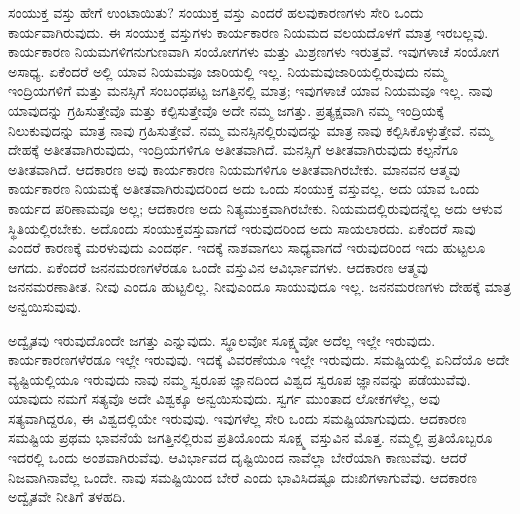 ಸಂಯುಕ್ತ ವಸ್ತು ಹೇಗೆ ಉಂಟಾಯಿತು? ಸಂಯುಕ್ತ ವಸ್ತು ಎಂದರೆ ಹಲವು\break ಕಾರಣಗಳು ಸೇರಿ ಒಂದು ಕಾರ್ಯವಾಗಿರುವುದು. ಈ ಸಂಯುಕ್ತ ವಸ್ತುಗಳು ಕಾರ್ಯಕಾರಣ ನಿಯಮದ ವಲಯದೊಳಗೆ ಮಾತ್ರ ಇರಬಲ್ಲವು. ಕಾರ್ಯಕಾರಣ ನಿಯಮಗಳಿ\-ಗನುಗುಣವಾಗಿ ಸಂಯೋಗಗಳು ಮತ್ತು ಮಿಶ್ರಣಗಳು ಇರುತ್ತವೆ. ಇವುಗಳಾಚೆ ಸಂಯೋಗ ಅಸಾಧ್ಯ. ಏಕೆಂದರೆ ಅಲ್ಲಿ ಯಾವ ನಿಯಮವೂ ಜಾರಿಯಲ್ಲಿ ಇಲ್ಲ. ನಿಯಮವು\break ಜಾರಿಯಲ್ಲಿರುವುದು ನಮ್ಮ ಇಂದ್ರಿಯಗಳಿಗೆ ಮತ್ತು ಮನಸ್ಸಿಗೆ ಸಂಬಂಧಪಟ್ಟ ಜಗತ್ತಿನಲ್ಲಿ ಮಾತ್ರ; ಇವುಗಳಾಚೆ ಯಾವ ನಿಯಮವೂ ಇಲ್ಲ. ನಾವು ಯಾವುದನ್ನು ಗ್ರಹಿಸುತ್ತೇವೊ ಮತ್ತು ಕಲ್ಪಿಸುತ್ತೇವೊ ಅದೇ ನಮ್ಮ ಜಗತ್ತು. ಪ್ರತ್ಯಕ್ಷವಾಗಿ ನಮ್ಮ ಇಂದ್ರಿಯಕ್ಕೆ ನಿಲುಕುವುದನ್ನು ಮಾತ್ರ ನಾವು ಗ್ರಹಿಸುತ್ತೇವೆ. ನಮ್ಮ ಮನಸ್ಸಿನಲ್ಲಿರುವುದನ್ನು ಮಾತ್ರ ನಾವು ಕಲ್ಪಿಸಿಕೊಳ್ಳುತ್ತೇವೆ. ನಮ್ಮ ದೇಹಕ್ಕೆ ಅತೀತವಾಗಿರುವುದು, ಇಂದ್ರಿಯಗಳಿಗೂ ಅತೀತವಾಗಿದೆ. ಮನಸ್ಸಿಗೆ ಅತೀತವಾಗಿರುವುದು ಕಲ್ಪನೆಗೂ ಅತೀತವಾಗಿದೆ. ಆದಕಾರಣ ಅವು ಕಾರ್ಯಕಾರಣ ನಿಯಮಗಳಿಗೂ ಅತೀತವಾಗಿರಬೇಕು. ಮಾನವನ ಆತ್ಮವು ಕಾರ್ಯಕಾರಣ ನಿಯಮಕ್ಕೆ ಅತೀತವಾಗಿರುವುದರಿಂದ ಅದು ಒಂದು ಸಂಯುಕ್ತ ವಸ್ತುವಲ್ಲ. ಅದು ಯಾವ ಒಂದು ಕಾರ್ಯದ ಪರಿಣಾಮವೂ ಅಲ್ಲ; ಆದಕಾರಣ ಅದು ನಿತ್ಯಮುಕ್ತವಾಗಿರಬೇಕು. ನಿಯಮದಲ್ಲಿರುವುದನ್ನೆಲ್ಲ ಅದು ಆಳುವ ಸ್ಥಿತಿಯಲ್ಲಿರಬೇಕು. ಅದೊಂದು ಸಂಯುಕ್ತ\break ವಸ್ತುವಾಗದೆ ಇರುವುದರಿಂದ ಅದು ಸಾಯಲಾರದು. ಏಕೆಂದರೆ ಸಾವು ಎಂದರೆ ಕಾರಣಕ್ಕೆ ಮರಳುವುದು ಎಂದರ್ಥ. ಇದಕ್ಕೆ ನಾಶವಾಗಲು ಸಾಧ್ಯವಾಗದೆ ಇರುವುದರಿಂದ ಇದು ಹುಟ್ಟಲೂ ಆಗದು. ಏಕೆಂದರೆ ಜನನಮರಣಗಳೆರಡೂ ಒಂದೇ ವಸ್ತುವಿನ ಆವಿರ್ಭಾವಗಳು. ಆದಕಾರಣ ಆತ್ಮವು ಜನನಮರಣಾತೀತ. ನೀವು ಎಂದೂ ಹುಟ್ಟಲಿಲ್ಲ. ನೀವು\break ಎಂದೂ ಸಾಯುವುದೂ ಇಲ್ಲ. ಜನನಮರಣಗಳು ದೇಹಕ್ಕೆ ಮಾತ್ರ ಅನ್ವಯಿಸುವುವು.

ಅದ್ವೈತವು ಇರುವುದೊಂದೇ ಜಗತ್ತು ಎನ್ನುವುದು. ಸ್ಥೂಲವೋ ಸೂಕ್ಷ್ಮವೋ ಅದೆಲ್ಲ ಇಲ್ಲೇ ಇರುವುದು. ಕಾರ್ಯಕಾರಣಗಳೆರಡೂ ಇಲ್ಲೇ ಇರುವುವು. ಇದಕ್ಕೆ ವಿವರಣೆಯೂ ಇಲ್ಲೇ ಇರುವುದು. ಸಮಷ್ಟಿಯಲ್ಲಿ ಏನಿದೆಯೊ ಅದೇ ವ್ಯಷ್ಟಿಯಲ್ಲಿಯೂ ಇರುವುದು ನಾವು ನಮ್ಮ ಸ್ವರೂಪ ಜ್ಞಾನದಿಂದ ವಿಶ್ವದ ಸ್ವರೂಪ ಜ್ಞಾನವನ್ನು ಪಡೆಯುವೆವು. ಯಾವುದು ನಮಗೆ ಸತ್ಯವೊ ಅದೇ ವಿಶ್ವಕ್ಕೂ ಅನ್ವಯಿಸುವುದು. ಸ್ವರ್ಗ ಮುಂತಾದ ಲೋಕಗಳೆಲ್ಲ, ಅವು ಸತ್ಯವಾಗಿದ್ದರೂ, ಈ ವಿಶ್ವದಲ್ಲಿಯೇ ಇರುವುವು. ಇವುಗಳೆಲ್ಲ ಸೇರಿ ಒಂದು ಸಮಷ್ಟಿಯಾಗುವುದು. ಆದಕಾರಣ ಸಮಷ್ಟಿಯ ಪ್ರಥಮ ಭಾವನೆಯೆ ಜಗತ್ತಿನಲ್ಲಿರುವ ಪ್ರತಿಯೊಂದು ಸೂಕ್ಷ್ಮ ವಸ್ತುವಿನ ಮೊತ್ತ. ನಮ್ಮಲ್ಲಿ ಪ್ರತಿಯೊಬ್ಬರೂ ಇದರಲ್ಲಿ ಒಂದು ಅಂಶವಾಗಿರುವೆವು. ಆವಿರ್ಭಾವದ ದೃಷ್ಟಿಯಿಂದ ನಾವೆಲ್ಲಾ ಬೇರೆಯಾಗಿ ಕಾಣುವೆವು. ಆದರೆ ನಿಜವಾಗಿ\break ನಾವೆಲ್ಲ ಒಂದೇ. ನಾವು ಸಮಷ್ಟಿಯಿಂದ ಬೇರೆ ಎಂದು ಭಾವಿಸಿದಷ್ಟೂ ದುಃಖಿಗಳಾಗುವೆವು. ಆದಕಾರಣ ಅದ್ವೈತವೇ ನೀತಿಗೆ ತಳಹದಿ.

